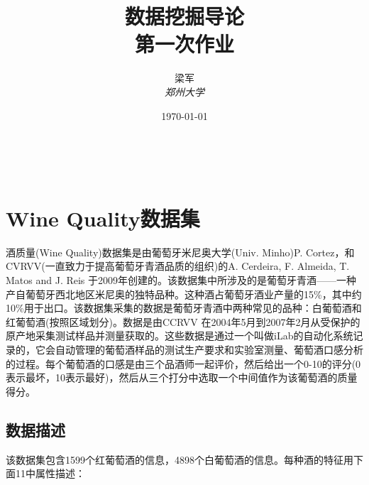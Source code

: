 \documentclass[a4paper, 11pt, hyperref, titlepage]{article}
\title{\textbf{数据挖掘导论}\\ %
第一次作业} %
\author{\textsc{梁军} %
\\{\textit{郑州大学}}} %
\date{\today} %
\makeatletter
\newcommand{\hei}[1]{{\HEI #1}}
\renewcommand{\maketitle}{ %

\begin{flushleft} %
{\LARGE\@title} %

\vspace{50pt} %

{\large\@author} %
\\\@date %

\vspace{40pt} %
\end{flushleft}
}
\makeatother
\begin{document}
\pagestyle{empty}
\vspace*{3cm}

\pagestyle{headings}

\maketitle %
\newpage




\section{\hei{Wine Quality数据集}}

酒质量(Wine Quality)数据集是由葡萄牙米尼奥大学(Univ. Minho)P. Cortez，和CVRVV(一直致力于提高葡萄牙青酒品质的组织)的A. Cerdeira, F. Almeida, T. Matos and J. Reis 于2009年创建的\cite{cortez2009modeling}。该数据集中所涉及的是葡萄牙青酒——一种产自葡萄牙西北地区米尼奥的独特品种。这种酒占葡萄牙酒业产量的15\%，其中约10\%用于出口。该数据集采集的数据是葡萄牙青酒中两种常见的品种：白葡萄酒和红葡萄酒(按照区域划分)。数据是由CCRVV 在2004年5月到2007年2月从受保护的原产地采集测试样品并测量获取的。这些数据是通过一个叫做iLab的自动化系统记录的，它会自动管理的葡萄酒样品的测试生产要求和实验室测量、葡萄酒口感分析的过程。每个葡萄酒的口感是由三个品酒师一起评价，然后给出一个0-10的评分(0表示最坏，10表示最好)，然后从三个打分中选取一个中间值作为该葡萄酒的质量得分。
\subsection{\hei{数据描述}}

该数据集包含1599个红葡萄酒的信息，4898个白葡萄酒的信息。每种酒的特征用下面11中属性描述：
\end{document}
